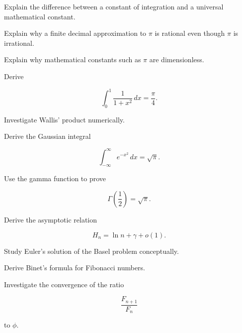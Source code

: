 \begin{exercise}[3]
Explain the difference between a constant of integration and a universal
mathematical constant.
\end{exercise}

\begin{exercise}[3]
Explain why a finite decimal approximation to \(\pi\) is rational even
though \(\pi\) is irrational.
\end{exercise}

\begin{exercise}[3]
Explain why mathematical constants such as \(\pi\) are dimensionless.
\end{exercise}

\begin{exercise}[3]
Derive

\[
\int_0^1
\frac{1}{1+x^2}\,dx
=
\frac{\pi}{4}.
\]
\end{exercise}

\begin{exercise}[3]
Investigate Wallis' product numerically.
\end{exercise}

\begin{exercise}[4]
Derive the Gaussian integral

\[
\int_{-\infty}^{\infty}
e^{-x^2}\,dx
=
\sqrt{\pi}.
\]
\end{exercise}

\begin{exercise}[4]
Use the gamma function to prove

\[
\Gamma\left(\frac12\right)
=
\sqrt{\pi}.
\]
\end{exercise}

\begin{exercise}[4]
Derive the asymptotic relation

\[
H_n
=
\ln n+\gamma+o(1).
\]
\end{exercise}

\begin{exercise}[4]
Study Euler's solution of the Basel problem conceptually.
\end{exercise}

\begin{exercise}[4]
Derive Binet's formula for Fibonacci numbers.
\end{exercise}

\begin{exercise}[4]
Investigate the convergence of the ratio

\[
\frac{F_{n+1}}{F_n}
\]

to \(\phi\).
\end{exercise}

